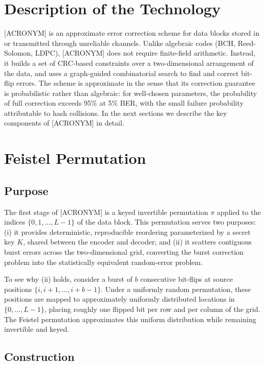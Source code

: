 \section*{Description of the Technology} \label{sec:tech_desc}
\noindent

[ACRONYM] is an approximate error correction scheme for data blocks stored in or transmitted through unreliable channels. Unlike algebraic codes (BCH, Reed-Solomon, LDPC), [ACRONYM] does not require finite-field arithmetic. Instead, it builds a set of CRC-based constraints over a two-dimensional arrangement of the data, and uses a graph-guided combinatorial search to find and correct bit-flip errors. The scheme is approximate in the sense that its correction guarantee is probabilistic rather than algebraic: for well-chosen parameters, the probability of full correction exceeds 95\% at 5\% BER, with the small failure probability attributable to hash collisions. In the next sections we describe the key components of [ACRONYM] in detail.

\section{Feistel Permutation}

\subsection{Purpose}

The first stage of [ACRONYM] is a keyed invertible permutation $\pi$ applied to the indices $\{0, 1, \ldots, L-1\}$ of the data block. This permutation serves two purposes: (i) it provides deterministic, reproducible reordering parameterized by a secret key $K$, shared between the encoder and decoder; and (ii) it scatters contiguous burst errors across the two-dimensional grid, converting the burst correction problem into the statistically equivalent random-error problem.

To see why (ii) holds, consider a burst of $b$ consecutive bit-flips at source positions $\{i, i+1, \ldots, i+b-1\}$. Under a uniformly random permutation, these positions are mapped to approximately uniformly distributed locations in $\{0, \ldots, L-1\}$, placing roughly one flipped bit per row and per column of the grid. The Feistel permutation approximates this uniform distribution while remaining invertible and keyed.

\subsection{Construction}

